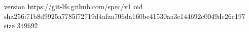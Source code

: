 version https://git-lfs.github.com/spec/v1
oid sha256:71b8d9925a7785f72719d4afaa706da160be41530aa3c144692c0049de26c197
size 349692
